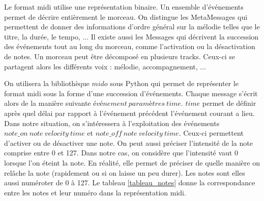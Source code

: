 Le format midi utilise une représentation binaire. Un ensemble d'événements permet de décrire entièrement le morceau. On distingue les MetaMessages qui permettent de donner des informations d'ordre général sur la mélodie telles que le titre, la durée, le tempo, ... Il existe aussi les Messages qui décrivent la succession des événements tout au long du morceau, comme l'activation ou la désactivation de notes. Un morceau peut être décomposé en plusieurs tracks. Ceux-ci se partagent alors les différents voix : mélodie, accompagnement, ... 

On utilisera la bibliothèque $mido$ sous Python qui permet de représenter le format midi sous la forme d'une succession d'événements. Chaque message s'écrit alors de la manière suivante $événement\ paramètres\ time$. $time$ permet de définir après quel délai par rapport à l'événement précédent l'événement courant a lieu. Dans notre situation, on s'intéressera à l'exploitation des événements $note\_on\ note\ velocity\ time$ et $note\_off\ note\ velocity\ time$. Ceux-ci permettent d'activer ou de désactiver une note. On peut aussi préciser l'intensité de la note comprise entre 0 et 127. Dans notre cas, on considère que l'intensité vaut 0 lorsque l'on éteint la note. En réalité, elle permet de préciser de quelle manière on relâche la note (rapidement ou si on laisse un peu durer). Les notes sont elles aussi numéroter de 0 à 127. Le tableau \ref{tableau_notes} donne la correspondance entre les notes et leur numéro dans la représentation midi.

